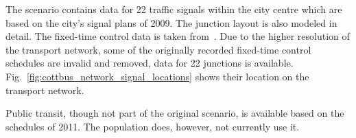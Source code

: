 The scenario contains data for 22 traffic signals within the city centre which are based on the city's signal plans of 2009. 
The junction layout is also modeled in detail.
The fixed-time control data is taken from~\citet{KoehlerStrehler2010SignalDemandOptimization}.  
Due to the higher resolution of the transport network, some of the originally recorded fixed-time control schedules are invalid and removed, data for 22 junctions is available. 
Fig.~\ref{fig:cottbus_network_signal_locations} shows their location on the transport network.  

Public transit, though not part of the original scenario, is available based on the schedules of 2011. The population does, however, not currently use it. 


